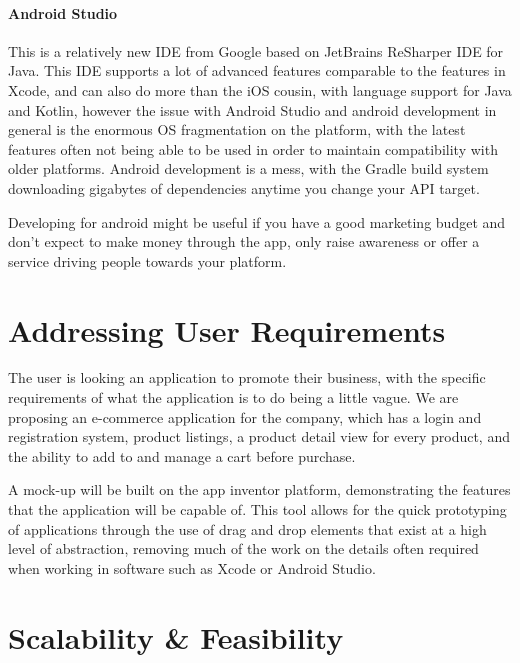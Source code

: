 \documentclass{scrreprt}
\begin{document}
\paragraph{Android Studio}

This is a relatively new IDE from Google based on JetBrains ReSharper IDE for Java. This IDE supports a lot of advanced features comparable to the features in Xcode, and can also do more than the iOS cousin, with language support for Java and Kotlin, however the issue with Android Studio and android development in general is the enormous OS fragmentation on the platform, with the latest features often not being able to be used in order to maintain compatibility with older platforms. Android development is a mess, with the Gradle build system downloading gigabytes of dependencies anytime you change your API target.

Developing for android might be useful if you have a good marketing budget and don't expect to make money through the app, only raise awareness or offer a service driving people towards your platform.

\section{Addressing User Requirements}

The user is looking an application to promote their business, with the specific requirements of what the application is to do being a little vague. We are proposing an e-commerce application for the company, which has a login and registration system, product listings, a product detail view for every product, and the ability to add to and manage a cart before purchase.

A mock-up will be built on the app inventor platform, demonstrating the features that the application will be capable of. This tool allows for the quick prototyping of applications through the use of drag and drop elements that exist at a high level of abstraction, removing much of the work on the details often required when working in software such as Xcode or Android Studio.

\section{Scalability \& Feasibility}
\end{document}
